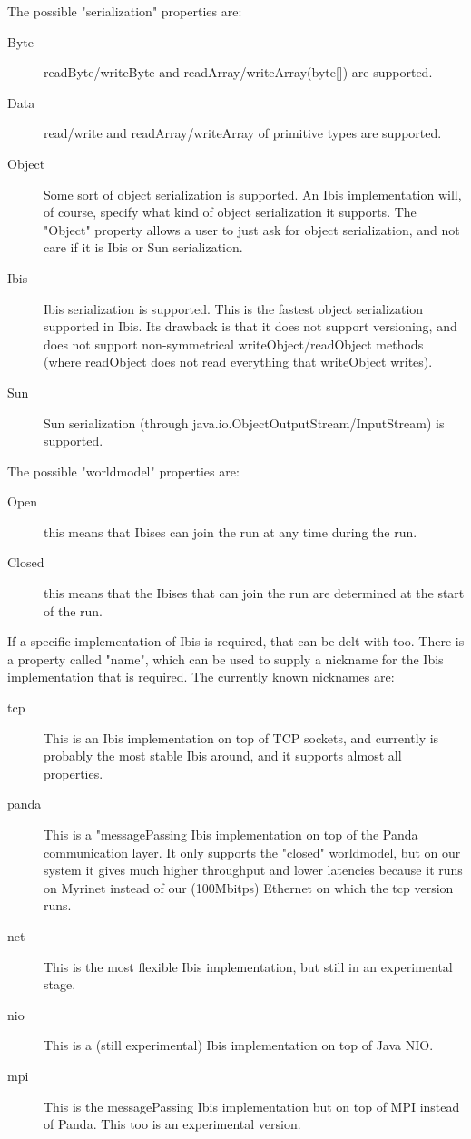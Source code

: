 \documentclass[10pt]{article}
\begin{document}
The possible "serialization" properties are:
\begin{description}
\item[Byte]
readByte/writeByte and readArray/writeArray(byte[]) are supported.
\item[Data]
read/write and readArray/writeArray of primitive types are supported.
\item[Object]
Some sort of object serialization is supported. An Ibis implementation
will, of course, specify what kind of object serialization it supports.
The "Object" property allows a user to just ask for object
serialization, and not care if it is Ibis or Sun serialization.
\item[Ibis]
Ibis serialization is supported.
This is the fastest object serialization supported in Ibis. Its drawback
is that it does not support versioning, and does not support
non-symmetrical writeObject/readObject methods (where readObject does not
read everything that writeObject writes).
\item[Sun]
Sun serialization (through java.io.ObjectOutputStream/InputStream) is
supported.
\end{description}

The possible "worldmodel" properties are:
\begin{description}
\item[Open]
this means that Ibises can join the run at any time during the run.
\item[Closed]
this means that the Ibises that can join the run are determined
at the start of the run.
\end{description}

If a specific implementation of Ibis is required, that can be delt with too.
There is a property called "name", which can be used to supply a nickname
for the Ibis implementation that is required.
The currently known nicknames are:
\begin{description}
\item[tcp]
This is an Ibis implementation on top of TCP sockets, and currently is
probably the most stable Ibis around, and it supports almost all properties.
\item[panda]
This is a "messagePassing Ibis implementation on top of the Panda
communication layer. It only supports the "closed" worldmodel,
but on our system it gives much higher throughput and lower latencies
because it runs on Myrinet instead of our (100Mbitps) Ethernet on which
the tcp version runs.
\item[net]
This is the most flexible Ibis implementation, but still in an experimental
stage.
\item[nio]
This is a (still experimental) Ibis implementation on top of Java NIO.
\item[mpi]
This is the messagePassing Ibis implementation but on top of MPI instead
of Panda. This too is an experimental version.
\end{description}
\end{document}

